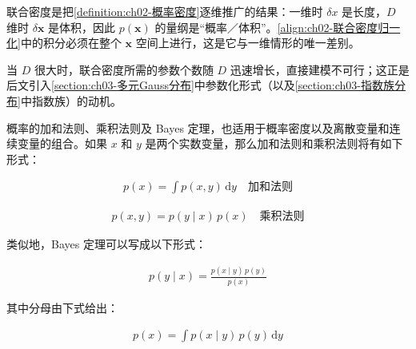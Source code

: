\documentclass[../../main.tex]{subfiles}
\begin{document}
\begin{remark}
联合密度是把\cref{definition:ch02-概率密度}逐维推广的结果：一维时 $\delta x$ 是长度，$D$ 维时 $\delta\mathbf{x}$ 是体积，因此 $p(\mathbf{x})$ 的量纲是“概率／体积”。\eqref{align:ch02-联合密度归一化}中的积分必须在整个 $\mathbf{x}$ 空间上进行，这是它与一维情形的唯一差别。

当 $D$ 很大时，联合密度所需的参数个数随 $D$ 迅速增长，直接建模不可行；这正是后文引入\cref{section:ch03-多元Gauss分布}中参数化形式（以及\cref{section:ch03-指数族分布}中指数族）的动机。
\end{remark}

概率的加和法则、乘积法则及 Bayes 定理，也适用于概率密度以及离散变量和连续变量的组合。如果 $x$ 和 $y$ 是两个实数变量，那么加和法则和乘积法则将有如下形式：

\begin{align}
  p(x) = \int p(x,y)\,\mathrm{d}y \quad \text{加和法则}
  \label{align:ch02-连续加和法则}
\end{align}

\begin{align}
  p(x,y) = p(y\mid x)\,p(x) \quad \text{乘积法则}
  \label{align:ch02-连续乘积法则}
\end{align}

类似地，Bayes 定理可以写成以下形式：

\begin{align}
  p(y\mid x) = \frac{p(x\mid y)\,p(y)}{p(x)}
  \label{align:ch02-连续Bayes}
\end{align}

其中分母由下式给出：

\begin{align}
  p(x) = \int p(x\mid y)\,p(y)\,\mathrm{d}y
  \label{align:ch02-Bayes分母连续}
\end{align}
\end{document}

